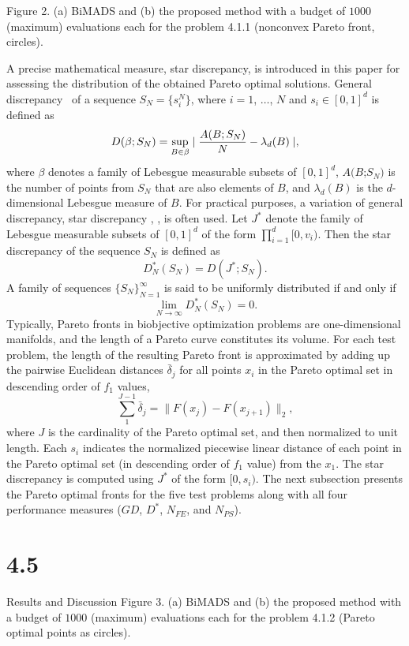 \topinsert
\vbox{
{\rmIX Figure 2. (a) BiMADS and (b) the proposed method with a budget of $1000$ 
(maximum) evaluations each for the problem 4.1.1 (nonconvex Pareto front, 
circles).}
}\endinsert

A precise mathematical measure, star discrepancy, is introduced in this paper 
for assessing the distribution of the obtained Pareto optimal solutions. 
General discrepancy \KWT\ of a sequence $S_N = \{s_i^N\}$, where $i=1$, 
$\ldots$, $N$ and $s_i\in {[0,1]}^d$ is defined as 
$$D(\beta;S_N) = {\sup_{B\in\beta} \mid{{A(B;S_N)}\over N} - \lambda_d(B) \mid 
},$$ 
\noindent where $\beta$ denotes a family of Lebesgue measurable subsets of 
${[0,1]}^d$, $A(B$;$S_N)$ is the number of points from $S_N$ that are also 
elements of $B$, and $\lambda_d(B)$ is the $d$-dimensional Lebesgue measure of 
$B$. For practical purposes, a variation of general discrepancy, star 
discrepancy \C, \KWT, is often used. Let $J^*$ denote the family of Lebesgue 
measurable subsets of ${[0,1]^d}$ of the form $\prod_{i=1}^d [0,v_i)$. Then 
the star discrepancy of the sequence $S_N$ is defined as
$$D_N^*(S_N) = D(J^*;S_N).$$
A family of sequences ${\{S_N\}}^\infty_{N=1}$ is said to be 
uniformly distributed if and only if
$$\lim_{N\to\infty}{D_N^*(S_N)} = 0.$$
\noindent Typically, Pareto fronts in biobjective optimization problems are 
one-dimensional manifolds, and the length of a Pareto curve constitutes its 
volume. For each test problem, the length of the resulting Pareto front is 
approximated by adding up the pairwise Euclidean distances $\bar\delta_j$ for 
all points $x_i$ in the Pareto optimal set in descending order of $f_1$ 
values,
$$\sum_{1}^{J-1}{\bar\delta_j = \|F(x_j)-F(x_{j+1})\|_2},$$ 
\noindent where $J$ is the cardinality of the Pareto optimal set, and then 
normalized to unit length. Each $s_i$ indicates the normalized piecewise linear
distance of each point in the Pareto optimal set (in descending order of $f_1$ 
value) from the $x_1$. The star discrepancy is computed using $J^*$ of the 
form $[0,s_i)$. 
The next subsection presents the Pareto optimal fronts for the five test 
problems along with all four performance measures ($GD$, $D^*$, $N_{FE}$, and 
$N_{PS}$). 

\vskip -3pt
\section{4.5}{Results and Discussion}\vskip -3pt
\topinsert
\vbox{
{\rmIX Figure 3. (a) BiMADS and (b) the proposed method with a budget of  
$1000$ (maximum) evaluations each for the problem 4.1.2 (Pareto optimal 
points as circles).}
}
\endinsert


